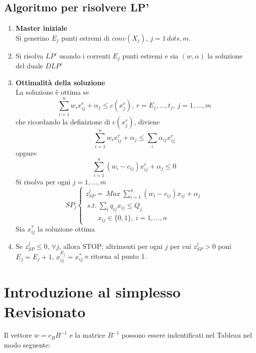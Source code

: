 \subsection{Algoritmo per risolvere LP'}
\begin{enumerate}
	\item \textbf{Master iniziale}\\
	Si generino $E_{j}$ punti estremi di $conv(X_{j})$, $j=1\,dots,m$.
	\item Si risolva $LP'$ usando i correnti $E_{j}$ punti estremi e sia $(w,\alpha)$ la soluzione del duale $DLP'$
	\item \textbf{Ottimalità della soluzione}\\
	La soluzione è ottima se
	\begin{equation*}
		\sum_{i=1}^{n}w_{i}x_{ij}^{r}+\alpha_{j}\le c(x_{j}^{r}),\ r=E_{j},\dots,t_{j},\ j=1,\dots,m
	\end{equation*}
	che ricordando la definizione di $c(x_{j}^{r})$, diviene
	\begin{equation*}
		\sum_{i=1}^{n}w_{i}x_{ij}^{r}+\alpha_{j}\le \sum_{i}\alpha_{ij}x_{ij}^{r}
	\end{equation*}
	oppure
	\begin{equation*}
		\sum_{i=1}^{n}(w_{i}-c_{ij})x_{ij}^{r}+\alpha_{j}\le 0
	\end{equation*}
	Si risolva per ogni $j=1,\dots,m$
	\begin{equation*}
		SP_{j}
		\begin{cases}
			z_{SP}^{j}=\ Max\ \sum_{i=1}^{n}(w_{i}-c_{ij})x_{ij}+\alpha_{j} \\
			\ s.t.\ \sum_{i}q_{ij}x_{ij}\le Q_{j} \\
			\ \ \ \ \ \ \ \ x_{ij}\in\{0,1\},\ i=1,\dots,n
		\end{cases}
	\end{equation*}
	Sia $x_{ij}^{*}$ la soluzione ottima
	\item Se $z_{SP}^{j}\le 0$, $\forall j$, allora STOP; altrimenti per ogni $j$ per cui $z_{SP}^{j}>0$ poni $E_{j}=E_{j}+1$, $x_{ij}^{E_{j}}=x_{ij}^{*}$ e ritorna al punto 1.
\end{enumerate}

\section{Introduzione al simplesso Revisionato}
Il vettore $w=c_{B}B^{-1}$ e la matrice $B^{-1}$ possono essere indentificati nel Tableau nel modo seguente:

